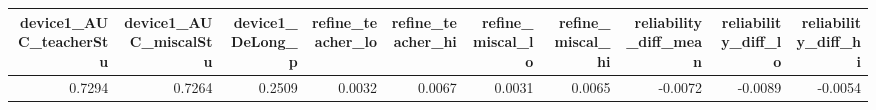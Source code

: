 \begin{tabular}{rrrrrrrrrr}
\toprule
device1_AUC_teacherStu & device1_AUC_miscalStu & device1_DeLong_p & refine_teacher_lo & refine_teacher_hi & refine_miscal_lo & refine_miscal_hi & reliability_diff_mean & reliability_diff_lo & reliability_diff_hi \\
\midrule
0.7294 & 0.7264 & 0.2509 & 0.0032 & 0.0067 & 0.0031 & 0.0065 & -0.0072 & -0.0089 & -0.0054 \\
\bottomrule
\end{tabular}
